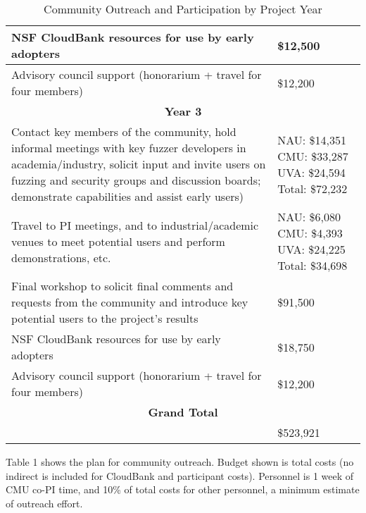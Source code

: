 \documentclass[12pt]{article}
\begin{document}
\begin{table}
\begin{tabular}{|p{12cm}|p{3cm}|}
    \hline
    NSF CloudBank resources for use by early adopters & \$12,500 \\
    \hline 
    Advisory council support (honorarium + travel for four members) & \$12,200 \\    
    \hline
    \hline
    \multicolumn{2}{c}{{\bf Year 3}} \\
    \hline
    \hline
   Contact key members of the community, hold informal meetings with
    key fuzzer developers in academia/industry, solicit input and
    invite users
    on fuzzing and security groups and discussion boards; demonstrate
    capabilities and assist early users) &  NAU:  \$14,351 CMU: \$33,287 UVA: \$24,594
                                                      Total: \$72,232 \\
    \hline
    Travel to PI meetings, and to industrial/academic venues to meet
    potential users and perform demonstrations, etc. & NAU: \$6,080 CMU: \$4,393 UVA:  \$24,225 Total: \$34,698\\
    \hline    
    Final workshop to solicit final comments and requests from the
    community and introduce key potential users to the project’s
    results & \$91,500 \\
    \hline
    NSF CloudBank resources for use by early adopters & \$18,750 \\
    \hline 
    Advisory council support (honorarium + travel for four members) & \$12,200 \\    
    \hline
    \hline
    \multicolumn{2}{c}{{\bf Grand Total}} \\
    \hline
                   &     \$523,921 \\
                     \hline
 
  \end{tabular}
\label{outreach}
  \caption{Community Outreach and Participation by Project Year}
  
\end{table}


Table 1 shows the plan for community
outreach.   Budget shown is total costs 
 (no indirect is included for CloudBank and participant costs).   Personnel is 1 week of CMU co-PI time, and 10\%
of total costs for other personnel, a
minimum estimate of outreach effort.
\end{document}

